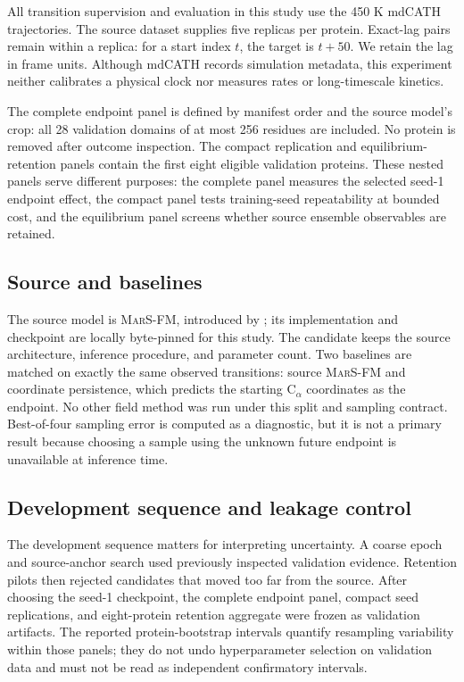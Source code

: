 \documentclass{article}
\newcommand{\marsfm}{\textsc{MarS-FM}}
\newcommand{\CA}{C$_\alpha$}
\begin{document}
All transition supervision and evaluation in this study use the 450 K mdCATH trajectories. The source dataset supplies five replicas per protein. Exact-lag pairs remain within a replica: for a start index $t$, the target is $t + 50$. We retain the lag in frame units. Although mdCATH records simulation metadata, this experiment neither calibrates a physical clock nor measures rates or long-timescale kinetics.

The complete endpoint panel is defined by manifest order and the source model's crop: all 28 validation domains of at most 256 residues are included. No protein is removed after outcome inspection. The compact replication and equilibrium-retention panels contain the first eight eligible validation proteins. These nested panels serve different purposes: the complete panel measures the selected seed-1 endpoint effect, the compact panel tests training-seed repeatability at bounded cost, and the equilibrium panel screens whether source ensemble observables are retained.

\subsection{Source and baselines}

The source model is \marsfm{}, introduced by \citet{kapusniak2025marsfm}; its implementation and checkpoint are locally byte-pinned for this study. The candidate keeps the source architecture, inference procedure, and parameter count. Two baselines are matched on exactly the same observed transitions: source \marsfm{} and coordinate persistence, which predicts the starting \CA{} coordinates as the endpoint. No other field method was run under this split and sampling contract. Best-of-four sampling error is computed as a diagnostic, but it is not a primary result because choosing a sample using the unknown future endpoint is unavailable at inference time.

\subsection{Development sequence and leakage control}

The development sequence matters for interpreting uncertainty. A coarse epoch and source-anchor search used previously inspected validation evidence. Retention pilots then rejected candidates that moved too far from the source. After choosing the seed-1 checkpoint, the complete endpoint panel, compact seed replications, and eight-protein retention aggregate were frozen as validation artifacts. The reported protein-bootstrap intervals quantify resampling variability within those panels; they do not undo hyperparameter selection on validation data and must not be read as independent confirmatory intervals.
\end{document}
